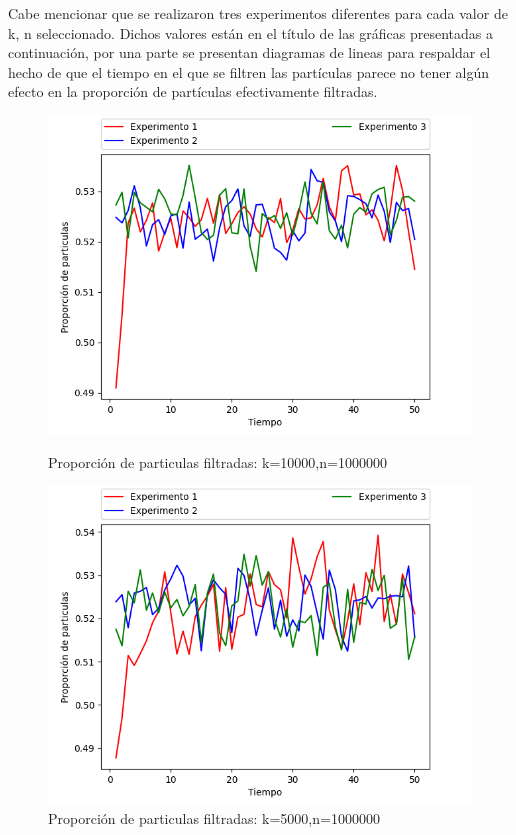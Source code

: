 \documentclass{article}
\begin{document}
	Cabe mencionar que se realizaron tres experimentos diferentes para cada valor de k, n seleccionado. Dichos valores están en el título de las gráficas  presentadas a continuación, por una parte se presentan diagramas de lineas  para respaldar el hecho de que el tiempo en el que se filtren las partículas parece no tener algún efecto en la proporción de partículas efectivamente filtradas. 
		\newpage
		
		\begin{figure}[h!]
		\centering
		\includegraphics[width=0.5\linewidth]{Figure_1.png}
		\caption{Proporción de particulas filtradas: k=10000,n=1000000}
		\label{fig:imagen2}
		
		
		\includegraphics[width=0.5\linewidth]{Figure_2.png}
		\caption{Proporción de particulas filtradas: k=5000,n=1000000}
		\label{fig:imagen3}
		
	
		\end{figure}
\end{document}
